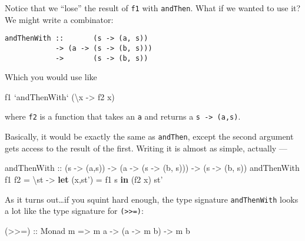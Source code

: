 \documentclass[]{article}
\newenvironment{Shaded}{}{}
\newcommand{\KeywordTok}[1]{\textcolor[rgb]{0.00,0.44,0.13}{\textbf{{#1}}}}
\newcommand{\DataTypeTok}[1]{\textcolor[rgb]{0.56,0.13,0.00}{{#1}}}
\newcommand{\OtherTok}[1]{\textcolor[rgb]{0.00,0.44,0.13}{{#1}}}
\newcommand{\FunctionTok}[1]{\textcolor[rgb]{0.02,0.16,0.49}{{#1}}}
\newcommand{\NormalTok}[1]{{#1}}
\begin{document}
Notice that we ``lose'' the result of \texttt{f1} with \texttt{andThen}.
What if we wanted to use it? We might write a combinator:

\begin{verbatim}
andThenWith ::       (s -> (a, s))
            -> (a -> (s -> (b, s)))
            ->       (s -> (b, s))
\end{verbatim}

Which you would use like

\begin{Shaded}
\begin{Highlighting}[]
\NormalTok{f1 }\OtherTok{`andThenWith`} \NormalTok{(\textbackslash{}x }\OtherTok{->} \NormalTok{f2 x)}
\end{Highlighting}
\end{Shaded}

where \texttt{f2} is a function that takes an \texttt{a} and returns a
\texttt{s\ -\textgreater{}\ (a,s)}.

Basically, it would be exactly the same as \texttt{andThen}, except the
second argument gets access to the result of the first. Writing it is
almost as simple, actually ---

\begin{Shaded}
\begin{Highlighting}[]
\OtherTok{andThenWith ::} \NormalTok{(s }\OtherTok{->} \NormalTok{(a,s)) }\OtherTok{->} \NormalTok{(a }\OtherTok{->} \NormalTok{(s }\OtherTok{->} \NormalTok{(b, s))) }\OtherTok{->} \NormalTok{(s }\OtherTok{->} \NormalTok{(b, s))}
\NormalTok{andThenWith f1 f2 }\FunctionTok{=} \NormalTok{\textbackslash{}st }\OtherTok{->} \KeywordTok{let} \NormalTok{(x,st') }\FunctionTok{=} \NormalTok{f1 s}
                           \KeywordTok{in}  \NormalTok{(f2 x) st'}
\end{Highlighting}
\end{Shaded}

As it turns out\ldots{}if you squint hard enough, the type signature
\texttt{andThenWith} looks a lot like the type signature for
\texttt{(\textgreater{}\textgreater{}=)}:

\begin{Shaded}
\begin{Highlighting}[]
\OtherTok{(>>=) ::} \DataTypeTok{Monad} \NormalTok{m }\OtherTok{=>} \NormalTok{m a }\OtherTok{->} \NormalTok{(a }\OtherTok{->} \NormalTok{m b) }\OtherTok{->} \NormalTok{m b}
\end{Highlighting}
\end{Shaded}
\end{document}
